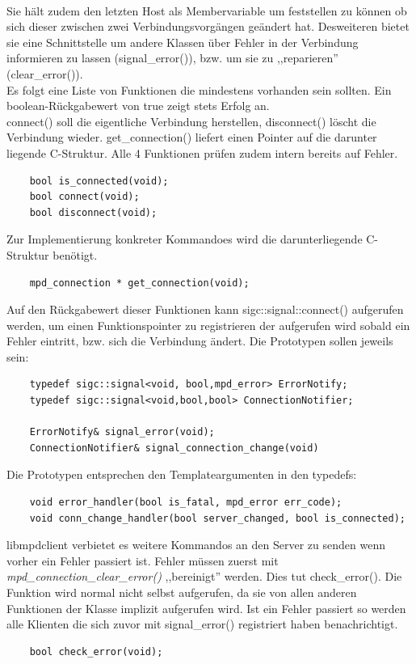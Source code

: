 \\
Sie hält zudem den letzten Host als Membervariable um feststellen zu können ob sich dieser zwischen 
zwei Verbindungsvorgängen geändert hat. Desweiteren bietet sie eine Schnittstelle um andere Klassen über Fehler in der Verbindung informieren zu lassen (signal\_error()), bzw. um sie zu ,,reparieren'' (clear\_error()).
\\
Es folgt eine Liste von Funktionen die mindestens vorhanden sein sollten.
Ein boolean-Rückgabewert von true zeigt stets Erfolg an.
\\
connect() soll die eigentliche Verbindung herstellen, disconnect() löscht die Verbindung wieder.
get\_connection() liefert einen Pointer auf die darunter liegende C-Struktur. Alle 4 Funktionen prüfen 
zudem intern bereits auf Fehler.
\begin{verbatim}
    bool is_connected(void);
    bool connect(void);
    bool disconnect(void);
\end{verbatim}

Zur Implementierung konkreter Kommandoes wird die darunterliegende C-Struktur benötigt.
\begin{verbatim}
    mpd_connection * get_connection(void);
\end{verbatim}

Auf den Rückgabewert dieser Funktionen kann sigc::signal::connect() aufgerufen werden, 
um einen Funktionspointer zu registrieren der aufgerufen wird sobald ein Fehler eintritt,
bzw. sich die Verbindung ändert. Die Prototypen sollen jeweils sein:
\begin{verbatim}
    typedef sigc::signal<void, bool,mpd_error> ErrorNotify;
    typedef sigc::signal<void,bool,bool> ConnectionNotifier;
    
    ErrorNotify& signal_error(void);
    ConnectionNotifier& signal_connection_change(void)
\end{verbatim}

Die Prototypen entsprechen den Templateargumenten in den typedefs:
\begin{verbatim}
    void error_handler(bool is_fatal, mpd_error err_code);
    void conn_change_handler(bool server_changed, bool is_connected); 
\end{verbatim} 

libmpdclient verbietet es weitere Kommandos an den Server zu senden wenn vorher ein Fehler passiert ist.
Fehler müssen zuerst mit \emph{mpd\_connection\_clear\_error()} ,,bereinigt'' werden. 
Dies tut check\_error(). Die Funktion wird normal nicht selbst aufgerufen, da sie von allen anderen Funktionen der Klasse
implizit aufgerufen wird. Ist ein Fehler passiert so werden alle Klienten die sich zuvor
mit signal\_error() registriert haben benachrichtigt. 
\begin{verbatim}
    bool check_error(void);
\end{verbatim}

